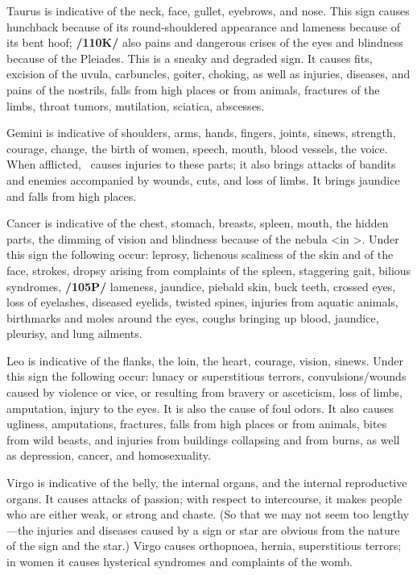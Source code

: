 Taurus \mn{\Taurus} is indicative of the neck, face, gullet, eyebrows, and nose. This sign causes hunchback because
of its round-shouldered appearance and lameness because of its bent hoof; \textbf{/110K/} also pains and dangerous crises of the eyes and blindness because of the Pleiades. This is a sneaky and degraded sign. It causes fits, excision of the uvula, carbuncles, goiter, choking, as well as injuries, diseases, and pains of the nostrils, falls from high places or from animals, fractures of the limbs, throat tumors, mutilation, sciatica, abscesses.

Gemini \mn{\Gemini} is indicative of shoulders, arms, hands, fingers, joints, sinews, strength, courage, change, the
birth of women, speech, mouth, blood vessels, the voice. When afflicted, \Gemini\, causes injuries to these parts; it also brings attacks of bandits and enemies accompanied by wounds, cuts, and loss of limbs. It brings jaundice and falls from high places.

Cancer \mn{\Cancer} is indicative of the chest, stomach, breasts, spleen, mouth, the hidden parts, the dimming of vision and blindness because of the nebula <in \Cancer>. Under this sign the following occur: leprosy, lichenous scaliness of the skin and of the face, strokes, dropsy arising from complaints of the spleen, staggering gait, bilious syndromes, \textbf{/105P/} lameness, jaundice, piebald skin, buck teeth, crossed eyes, loss of eyelashes, diseased eyelids, twisted spines, injuries from aquatic animals, birthmarks and moles around the eyes, coughs bringing up blood, jaundice, pleurisy, and lung ailments.

Leo \mn{\Leo} is indicative of the flanks, the loin, the heart, courage, vision, sinews. Under this sign the
following occur: lunacy or superstitious terrors, convulsions/wounds caused by violence or vice, or resulting from bravery or asceticism, loss of limbs, amputation, injury to the eyes. It is also the cause of foul odors. It also causes ugliness, amputations, fractures, falls from high places or from animals, bites from wild beasts, and injuries from buildings collapsing and from burns, as well as depression, cancer, and
homosexuality.

Virgo \mn{\Virgo} is indicative of the belly, the internal organs, and the internal reproductive organs. It causes attacks of passion; with respect to intercourse, it makes people who are either weak, or strong and chaste. (So that we may not seem too lengthy—the injuries and diseases caused by a sign or star are obvious from the nature of the sign and the star.) Virgo causes orthopnoea, hernia, superstitious terrors; in women it causes hysterical syndromes and complaints of the womb.

